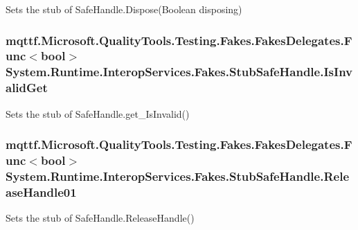 Sets the stub of Safe\-Handle.\-Dispose(\-Boolean disposing)

\hypertarget{class_system_1_1_runtime_1_1_interop_services_1_1_fakes_1_1_stub_safe_handle_a51329878c7b35ca3da67ba98868df47f}{
\subsubsection[{Is\-Invalid\-Get}]{\setlength{\rightskip}{0pt plus 5cm}mqttf.\-Microsoft.\-Quality\-Tools.\-Testing.\-Fakes.\-Fakes\-Delegates.\-Func$<$bool$>$ System.\-Runtime.\-Interop\-Services.\-Fakes.\-Stub\-Safe\-Handle.\-Is\-Invalid\-Get}}\label{class_system_1_1_runtime_1_1_interop_services_1_1_fakes_1_1_stub_safe_handle_a51329878c7b35ca3da67ba98868df47f}


Sets the stub of Safe\-Handle.\-get\-\_\-\-Is\-Invalid()

\hypertarget{class_system_1_1_runtime_1_1_interop_services_1_1_fakes_1_1_stub_safe_handle_ae4eaf06523cba7b56849f8bf51a681ec}{
\subsubsection[{Release\-Handle01}]{\setlength{\rightskip}{0pt plus 5cm}mqttf.\-Microsoft.\-Quality\-Tools.\-Testing.\-Fakes.\-Fakes\-Delegates.\-Func$<$bool$>$ System.\-Runtime.\-Interop\-Services.\-Fakes.\-Stub\-Safe\-Handle.\-Release\-Handle01}}\label{class_system_1_1_runtime_1_1_interop_services_1_1_fakes_1_1_stub_safe_handle_ae4eaf06523cba7b56849f8bf51a681ec}


Sets the stub of Safe\-Handle.\-Release\-Handle()



